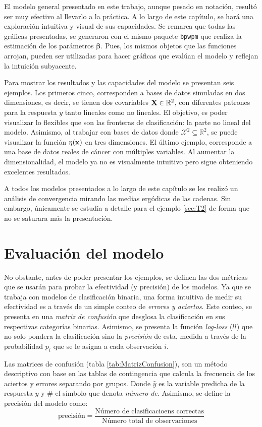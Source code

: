 \documentclass[../Main/Main.tex]{subfiles}
\begin{document}
El modelo general presentado en este trabajo, aunque pesado en notación, resultó ser muy efectivo al llevarlo a la práctica. A lo largo de este capítulo, se hará una exploración intuitiva y visual de sus capacidades. Se remarca que todas las gráficas presentadas, se generaron con el mismo paquete \verb|bpwpm| que realiza la estimación de los parámetros $\bm{\beta}$. Pues, los mismos objetos que las funciones arrojan, pueden ser utilizadas para hacer gráficas que evalúan el modelo y reflejan la intuición subyacente. 

Para mostrar los resultados y las capacidades del modelo se presentan seis ejemplos. Los primeros cinco,  corresponden a bases de datos simuladas en dos dimensiones, es decir, se tienen dos covariables $\mathbf{X}\in\mathbb{R}^2$,  con diferentes patrones para la respuesta $y$ tanto lineales como no lineales. El objetivo, es poder visualizar lo flexibles que son las fronteras de clasificación: la parte no lineal del modelo. Asimismo, al trabajar con bases de datos donde $\mathcal{X}^2\subseteq\mathbb{R}^2$, se puede visualizar la función $\eta(\mathbf{x})$ en tres dimensiones. El último ejemplo, corresponde a una base de datos reales de cáncer con múltiples variables.  Al aumentar la dimensionalidad, el modelo ya no es visualmente intuitivo pero sigue obteniendo excelentes resultados.

A todos los modelos presentados a lo largo de este capítulo se les realizó un análisis de convergencia mirando las medias ergódicas de las cadenas. Sin embargo, únicamente se estudia a detalle para el ejemplo \ref{sec:T2} de forma que no se saturara más la presentación.

\section{Evaluación del modelo}
No obstante, antes de poder presentar los ejemplos, se definen las dos métricas que se usarán para probar la efectividad (y precisión) de los modelos. Ya que se trabaja con modelos de clasificación binaria, una forma intuitiva de medir su efectividad es a través de un simple conteo de \textit{errores y aciertos}. Este conteo, se presenta en una \textit{matriz de confusión} que desglosa la clasificación en sus respectivas categorías binarias. Asimismo, se presenta la función \textit{log-loss} ($ll$) que no solo pondera la clasificación sino la \textit{precisión} de esta, medida a través de la probabilidad $p_i$ que se le asigna a cada observación $i$.

Las matrices de confusión (tabla \ref{tab:MatrizConfusion}), son un método descriptivo con base en las tablas de contingencia que calcula la frecuencia de los aciertos y errores separando por grupos. Donde $\hat{y}$ es la variable predicha de la respuesta $y$ y $\#$ el símbolo que denota \textit{número de}. Asimismo, se define la precisión del modelo como:
$$ \text{precisión} = \dfrac{\text{Número de clasificacioens correctas}}{\text{Número total de observaciones}}$$
\end{document}
